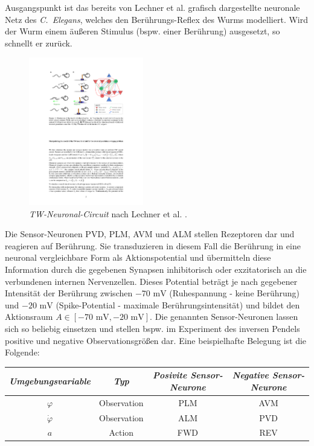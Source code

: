 	Ausgangspunkt ist das bereits von Lechner et al. \cite{WormLevelRL} grafisch dargestellte neuronale Netz des \textit{C.~Elegans}, welches den Berührungs-Reflex des Wurms modelliert. Wird der Wurm einem äußeren Stimulus (bspw. einer Berührung) ausgesetzt, so schnellt er zurück.
	\enlargethispage{2\baselineskip}
	\begin{figure}[H] %
		\centering
		\includegraphics[width=5cm]{figures/chap_neuron/Orig_TW_Circuit.pdf}
		\caption{\textit{TW-Neuronal-Circuit} nach Lechner et al. \cite{WormLevelRL}.}
		\label{fig:01_TW-Circuit}
	\end{figure}
	Die Sensor-Neuronen PVD, PLM, AVM und ALM stellen Rezeptoren dar und reagieren auf Berührung. Sie transduzieren in diesem Fall die Berührung in eine neuronal vergleichbare Form als Aktionspotential und übermitteln diese Information durch die gegebenen Synapsen inhibitorisch oder exzitatorisch an die verbundenen internen Nervenzellen. Dieses Potential beträgt je nach gegebener Intensität der Berührung zwischen $-70\text{ mV}$ (Ruhespannung - keine Berührung) und $-20\text{ mV}$ (Spike-Potential - maximale Berührungsintensität) und bildet den Aktionsraum $A\in[-70\text{ mV}, -20\text{ mV}]$. Die genannten Sensor-Neuronen lassen sich so beliebig einsetzen und stellen bspw. im Experiment des inversen Pendels positive und negative Observationsgrößen dar. Eine beispielhafte Belegung ist die Folgende:
	\begin{center}
	\begin{tabular}{c@{\hskip 0.5cm}c@{\hskip 0.5cm}c@{\hskip 0.5cm}c}    \toprule
		\setlength{\tabcolsep}{50pt}
		\renewcommand{\arraystretch}{1.5}
		\emph{Umgebungsvariable} & \emph{Typ}  & \emph{Posivite Sensor-Neurone} & \emph{Negative Sensor-Neurone} \\\midrule
		$\varphi$ 				 & Observation & PLM							& AVM							 \\ 
		$\dot{\varphi}$		 	 & Observation & ALM							& PVD							 \\
		$a$						 & Action	   & FWD							& REV							 \\\bottomrule
		\hline
	\end{tabular}
	\end{center}
